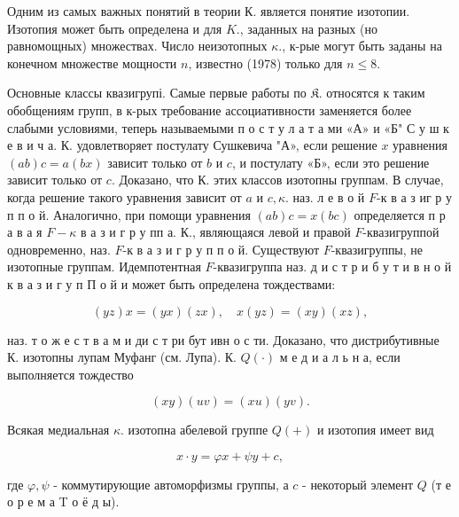\documentclass[10pt]{article}
\begin{document}
Одним из самых важных понятий в теории К. является понятие изотопии. Изотопия может быть определена и для $K .$, заданных на разных (но равномощных) множествах. Число неизотопных $\kappa$., к-рые могут быть заданы на конечном множестве мощности $n$, известно (1978) только для $n \leqslant 8$.



Основные классы квазигрупі. Самые первые работы по $\mathfrak{K}$. относятся к таким обобщениям групп, в к-рых требование ассоциативности заменяется более слабыми условиями, теперь называемыми п о с т у л а т а ми «А» и «Б" С у ш к е в и ч а. К. удовлетворяет постулату Сушкевича "А», если решение $x$ уравнения $(a b) c=a(b x)$ зависит только от $b$ и $c$, и постулату «Б», если это решение зависит только от $c$. Доказано, что К. этих классов изотопны группам. В случае, когда решение такого уравнения зависит от $a$ и $c, \kappa$. наз. л е в о й $F$-к в а з иг р у п п о й. Аналогично, при помощи уравнения $(a b) c=x(b c)$ определяется п р а в а я $F-\kappa$ в а з и г р у пп а. К., являющаяся левой и правой $F$-квазигруппой одновременно, наз. $F$-к в а з и г р у п п о й. Существуют $F$-квазигруппы, не изотопные группам. Идемпотентная $F$-квазигруппа наз. д и с т р и б у т и в н о й к в а з и г у п П о й и может быть определена тождествами:



\[

(y z) x=(y x)(z x), \quad x(y z)=(x y)(x z),

\]



наз. т о ж е с т в а м и ди с т ри бут ивн о с ти. Доказано, что дистрибутивные К. изотопны лупам Муфанг (см. Лупа). К. $Q(\cdot)$ м е д и а л ь н а, если выполняется тождество



\[

(x y)(u v)=(x u)(y v) .

\]



Всякая медиальная $\kappa$. изотопна абелевой группе $Q(+)$ и изотопия имеет вид



\[

x \cdot y=\varphi x+\psi y+c,

\]



где $\varphi, \psi$ - коммутирующие автоморфизмы группы, а $c$ - некоторый элемент $Q$ (т е о р е м а T о ё д ы).
\end{document}
